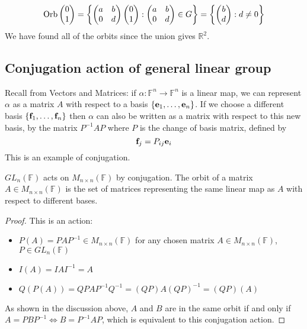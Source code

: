 \begin{itemize}
	      \[
		      \operatorname{Orb}\begin{pmatrix}
			      0 \\ 1
		      \end{pmatrix} = \left\{ \begin{pmatrix}
			      a & b \\ 0 & d
		      \end{pmatrix} \begin{pmatrix}
			      0 \\ 1
		      \end{pmatrix}: \begin{pmatrix}
			      a & b \\ 0 & d
		      \end{pmatrix} \in G \right\} = \left\{ \begin{pmatrix}
			      b \\ d
		      \end{pmatrix}: d \neq 0 \right\}
	      \]
	      We have found all of the orbits since the union gives \(\mathbb R^2\).
\end{itemize}

\subsection{Conjugation action of general linear group}
Recall from Vectors and Matrices: if \(\alpha\colon \mathbb F^n \to \mathbb F^n\) is a linear map, we can represent \(\alpha\) as a matrix \(A\) with respect to a basis \(\{ \vb e_1, \dots, \vb e_n \}\).
If we choose a different basis \(\{ \vb f_1, \dots, \vb f_n \}\) then \(\alpha\) can also be written as a matrix with respect to this new basis, by the matrix \(P^{-1}AP\) where \(P\) is the change of basis matrix, defined by
\[
	\vb f_j = P_{ij}\vb e_i
\]
This is an example of conjugation.
\begin{proposition}
	\(GL_n(\mathbb F)\) acts on \(M_{n \times n}(\mathbb F)\) by conjugation.
	The orbit of a matrix \(A \in M_{n \times n}(\mathbb F)\) is the set of matrices representing the same linear map as \(A\) with respect to different bases.
\end{proposition}
\begin{proof}
	This is an action:
	\begin{itemize}
		\item \(P(A) = PAP^{-1} \in M_{n \times n}(\mathbb F)\) for any chosen matrix \(A \in M_{n \times n}(\mathbb F)\), \(P \in GL_n(\mathbb F)\)
		\item \(I(A) = IAI^{-1} = A\)
		\item \(Q(P(A)) = QPAP^{-1}Q^{-1} = (QP)A(QP)^{-1} = (QP)(A)\)
	\end{itemize}
	As shown in the discussion above, \(A\) and \(B\) are in the same orbit if and only if \(A = PBP^{-1} \iff B = P^{-1}AP\), which is equivalent to this conjugation action.
\end{proof}

